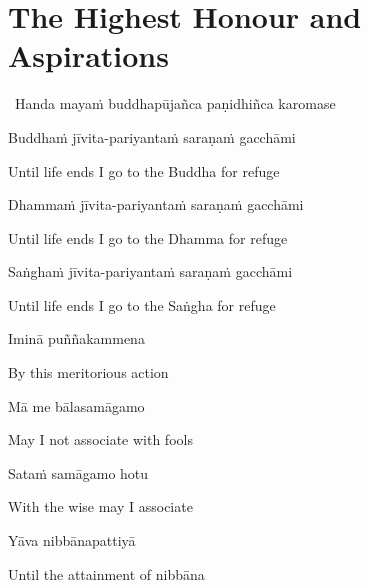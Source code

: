 
\section{The Highest Honour and Aspirations}
\label{highest-honour-aspirations}

\begin{leader}
  \anglebracketleft\ \hspace{-0.5mm}Handa mayaṁ buddhapūjañca paṇidhiñca karomase \hspace{-0.5mm}\anglebracketright\
\end{leader}

Buddhaṁ jīvita-pariyantaṁ saraṇaṁ gacchāmi

\begin{english}
  Until life ends I go to the Buddha for refuge
\end{english}

Dhammaṁ jīvita-pariyantaṁ saraṇaṁ gacchāmi

\begin{english}
  Until life ends I go to the Dhamma for refuge
\end{english}

Saṅghaṁ jīvita-pariyantaṁ saraṇaṁ gacchāmi

\begin{english}
  Until life ends I go to the Saṅgha for refuge
\end{english}

Iminā puññakammena

\begin{english}
  By this meritorious action
\end{english}

Mā me bālasamāgamo

\begin{english}
  May I not associate with fools
\end{english}

Sataṁ samāgamo hotu

\begin{english}
  With the wise may I associate
\end{english}

Yāva nibbānapattiyā

\begin{english}
  Until the attainment of nibbāna
\end{english}


